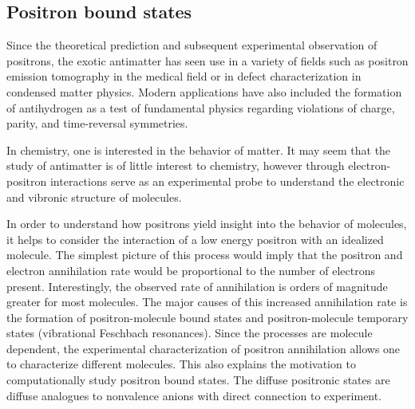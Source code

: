 \subsection{Positron bound states}
Since the theoretical prediction\cite{10.1098/rspa.1928.0023} and subsequent experimental observation\cite{10.1126/science.76.1967.238} of positrons, the exotic antimatter has seen use in a variety of fields such as positron emission tomography in the medical field or in defect characterization in condensed matter physics.\citehere
Modern applications have also included the formation of antihydrogen as a test of fundamental physics regarding violations of charge, parity, and time-reversal symmetries.\citehere

In chemistry, one is interested in the behavior of matter.
It may seem that the study of antimatter is of little interest to chemistry, however through electron-positron interactions serve as an experimental probe to understand the electronic and vibronic structure of molecules.

In order to understand how positrons yield insight into the behavior of molecules, it helps to consider the interaction of a low energy positron with an idealized molecule.
The simplest picture of this process would imply that the positron and electron annihilation rate would be proportional to the number of electrons present.\citehere %
Interestingly, the observed rate of annihilation is orders of magnitude greater for most molecules.\citehere %
The major causes of this increased annihilation rate is the formation of positron-molecule bound states and positron-molecule temporary states (vibrational Feschbach resonances).\citehere
Since the processes are molecule dependent, the experimental characterization of positron annihilation allows one to characterize different molecules.
This also explains the motivation to computationally study positron bound states.
The diffuse positronic states are diffuse analogues to nonvalence anions with direct connection to experiment.
